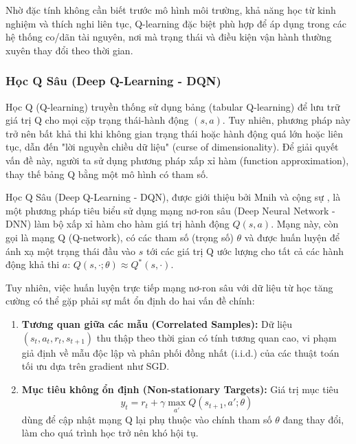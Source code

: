 Nhờ đặc tính không cần biết trước mô hình môi trường, khả năng học từ kinh nghiệm và thích nghi liên tục, Q-learning đặc biệt phù hợp để áp dụng trong các hệ thống co/dãn tài nguyên, nơi mà trạng thái và điều kiện vận hành thường xuyên thay đổi theo thời gian.

\subsubsection{Học Q Sâu (Deep Q-Learning - DQN)}

Học Q (Q-learning) truyền thống sử dụng bảng (tabular Q-learning) để lưu trữ giá trị Q cho mọi cặp trạng thái-hành động $(s, a)$. Tuy nhiên, phương pháp này trở nên bất khả thi khi không gian trạng thái hoặc hành động quá lớn hoặc liên tục, dẫn đến "lời nguyền chiều dữ liệu" (curse of dimensionality). Để giải quyết vấn đề này, người ta sử dụng phương pháp xấp xỉ hàm (function approximation), thay thế bảng Q bằng một mô hình có tham số.

Học Q Sâu (Deep Q-Learning - DQN), được giới thiệu bởi Mnih và cộng sự \cite{Mnih2015HumanlevelCT}, là một phương pháp tiêu biểu sử dụng mạng nơ-ron sâu (Deep Neural Network - DNN) làm bộ xấp xỉ hàm cho hàm giá trị hành động $Q(s, a)$. Mạng này, còn gọi là mạng Q (Q-network), có các tham số (trọng số) $\theta$ và được huấn luyện để ánh xạ một trạng thái đầu vào $s$ tới các giá trị Q ước lượng cho tất cả các hành động khả thi $a$: $Q(s, \cdot ; \theta) \approx Q^*(s, \cdot)$.

Tuy nhiên, việc huấn luyện trực tiếp mạng nơ-ron sâu với dữ liệu từ học tăng cường có thể gặp phải sự mất ổn định do hai vấn đề chính:
\begin{enumerate}
    \item \textbf{Tương quan giữa các mẫu (Correlated Samples):} Dữ liệu $(s_t, a_t, r_t, s_{t+1})$ thu thập theo thời gian có tính tương quan cao, vi phạm giả định về mẫu độc lập và phân phối đồng nhất (i.i.d.) của các thuật toán tối ưu dựa trên gradient như SGD.
    \item \textbf{Mục tiêu không ổn định (Non-stationary Targets):} Giá trị mục tiêu
          \begin{equation}y_t = r_t + \gamma \max_{a'} Q(s_{t+1}, a'; \theta)\end{equation}
          dùng để cập nhật mạng Q lại phụ thuộc vào chính tham số $\theta$ đang thay đổi, làm cho quá trình học trở nên khó hội tụ.
\end{enumerate}

